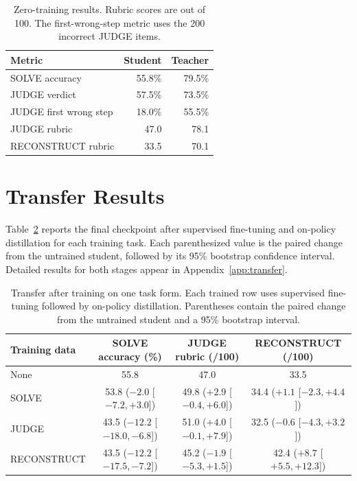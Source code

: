 \documentclass[11pt]{article}
\begin{document}
\begin{table}[t]
\centering
\small
\setlength{\tabcolsep}{4pt}
\begin{tabular}{lrr}
\toprule
Metric & Student & Teacher \\
\midrule
SOLVE accuracy & 55.8\% & 79.5\% \\
JUDGE verdict & 57.5\% & 73.5\% \\
JUDGE first wrong step & 18.0\% & 55.5\% \\
JUDGE rubric & 47.0 & 78.1 \\
RECONSTRUCT rubric & 33.5 & 70.1 \\
\bottomrule
\end{tabular}
\caption{Zero-training results. Rubric scores are out of 100. The first-wrong-step metric uses the 200 incorrect JUDGE items.}
\label{tab:baseline}
\end{table}

\section{Transfer Results}

Table~\ref{tab:transfer-main} reports the final checkpoint after supervised fine-tuning and on-policy distillation for each training task. Each parenthesized value is the paired change from the untrained student, followed by its 95\% bootstrap confidence interval. Detailed results for both stages appear in Appendix~\ref{app:transfer}.

\begin{table}[t]
\centering
\footnotesize
\setlength{\tabcolsep}{5pt}
\begin{tabular}{lccc}
\toprule
Training data & SOLVE accuracy (\%) & JUDGE rubric (/100) & RECONSTRUCT (/100) \\
\midrule
None & 55.8 & 47.0 & 33.5 \\
SOLVE & 53.8 ($-2.0$ [$-7.2,+3.0$]) & 49.8 ($+2.9$ [$-0.4,+6.0$]) & 34.4 ($+1.1$ [$-2.3,+4.4$]) \\
JUDGE & 43.5 ($-12.2$ [$-18.0,-6.8$]) & 51.0 ($+4.0$ [$-0.1,+7.9$]) & 32.5 ($-0.6$ [$-4.3,+3.2$]) \\
RECONSTRUCT & 43.5 ($-12.2$ [$-17.5,-7.2$]) & 45.2 ($-1.9$ [$-5.3,+1.5$]) & 42.4 ($+8.7$ [$+5.5,+12.3$]) \\
\bottomrule
\end{tabular}
\caption{Transfer after training on one task form. Each trained row uses supervised fine-tuning followed by on-policy distillation. Parentheses contain the paired change from the untrained student and a 95\% bootstrap interval.}
\label{tab:transfer-main}
\end{table}
\end{document}

